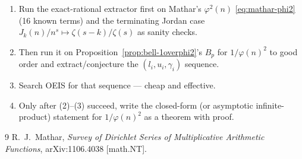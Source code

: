 \documentclass[11pt]{article}
\begin{document}
\begin{enumerate}
\item Run the exact-rational extractor first on Mathar's $\varphi^2(n)$
\eqref{eq:mathar-phi2} (16 known terms) and the terminating Jordan case
$J_k(n)/n^s\mapsto\zeta(s-k)/\zeta(s)$ as sanity checks.
\item Then run it on Proposition~\ref{prop:bell-1overphi2}'s $B_p$ for
$1/\varphi(n)^2$ to good order and extract/conjecture the $(l_i,u_i,\gamma_i)$
sequence.
\item Search OEIS for that sequence --- cheap and effective.
\item Only after (2)--(3) succeed, write the closed-form (or asymptotic
infinite-product) statement for $1/\varphi(n)^2$ as a theorem with proof.
\end{enumerate}

\begin{thebibliography}{9}
R.~J.~Mathar, \emph{Survey of Dirichlet Series of Multiplicative Arithmetic
Functions}, arXiv:1106.4038 [math.NT].
\end{thebibliography}
\end{document}
